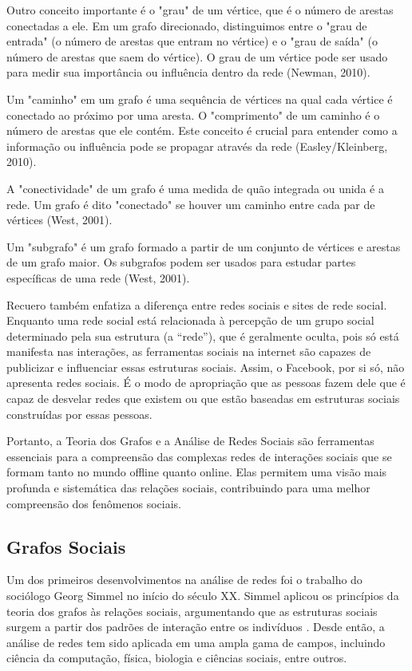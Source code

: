 Outro conceito importante é o "grau" de um vértice, que é o número de arestas conectadas a ele. Em um grafo direcionado, distinguimos entre o "grau de entrada" (o número de arestas que entram no vértice) e o "grau de saída" (o número de arestas que saem do vértice). O grau de um vértice pode ser usado para medir sua importância ou influência dentro da rede (Newman, 2010).

Um "caminho" em um grafo é uma sequência de vértices na qual cada vértice é conectado ao próximo por uma aresta. O "comprimento" de um caminho é o número de arestas que ele contém. Este conceito é crucial para entender como a informação ou influência pode se propagar através da rede (Easley/Kleinberg, 2010).

A "conectividade" de um grafo é uma medida de quão integrada ou unida é a rede. Um grafo é dito "conectado" se houver um caminho entre cada par de vértices (West, 2001).

Um "subgrafo" é um grafo formado a partir de um conjunto de vértices e arestas de um grafo maior. Os subgrafos podem ser usados para estudar partes específicas de uma rede (West, 2001).

Recuero também enfatiza a diferença entre redes sociais e sites de rede social. Enquanto uma rede social está relacionada à percepção de um grupo social determinado pela sua estrutura (a “rede”), que é geralmente oculta, pois só está manifesta nas interações, as ferramentas sociais na internet são capazes de publicizar e influenciar essas estruturas sociais. Assim, o Facebook, por si só, não apresenta redes sociais. É o modo de apropriação que as pessoas fazem dele que é capaz de desvelar redes que existem ou que estão baseadas em estruturas sociais construídas por essas pessoas.

Portanto, a Teoria dos Grafos e a Análise de Redes Sociais são ferramentas essenciais para a compreensão das complexas redes de interações sociais que se formam tanto no mundo offline quanto online. Elas permitem uma visão mais profunda e sistemática das relações sociais, contribuindo para uma melhor compreensão dos fenômenos sociais.

\subsection{Grafos Sociais}

Um dos primeiros desenvolvimentos na análise de redes foi o trabalho do sociólogo Georg Simmel no início do século XX. Simmel aplicou os princípios da teoria dos grafos às relações sociais, argumentando que as estruturas sociais surgem a partir dos padrões de interação entre os indivíduos \cite[]{2021_Hollstein}. Desde então, a análise de redes tem sido aplicada em uma ampla gama de campos, incluindo ciência da computação, física, biologia e ciências sociais, entre outros.

